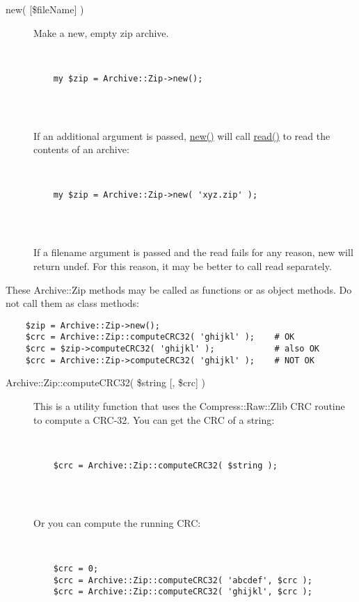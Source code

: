 \documentclass[]{article}
\renewcommand{\emph}[1]{\underline{#1}}
\begin{document}
\begin{description}
\item[new( {[}\$fileName{]} )]
Make a new, empty zip archive.

~

\begin{verbatim}
    my $zip = Archive::Zip->new();
    
\end{verbatim}

~

If an additional argument is passed, \emph{new()} will call
\emph{read()} to read the contents of an archive:

~

\begin{verbatim}
    my $zip = Archive::Zip->new( 'xyz.zip' );
    
\end{verbatim}

~

If a filename argument is passed and the read fails for any reason, new
will return undef. For this reason, it may be better to call read
separately.
\end{description}


These Archive::Zip methods may be called as functions or as object
methods. Do not call them as class methods:

\begin{verbatim}
    $zip = Archive::Zip->new();
    $crc = Archive::Zip::computeCRC32( 'ghijkl' );    # OK
    $crc = $zip->computeCRC32( 'ghijkl' );            # also OK
    $crc = Archive::Zip->computeCRC32( 'ghijkl' );    # NOT OK
\end{verbatim}

\begin{description}
\item[Archive::Zip::computeCRC32( \$string {[}, \$crc{]} )]
This is a utility function that uses the Compress::Raw::Zlib CRC routine
to compute a CRC-32. You can get the CRC of a string:

~

\begin{verbatim}
    $crc = Archive::Zip::computeCRC32( $string );
    
\end{verbatim}

~

Or you can compute the running CRC:

~

\begin{verbatim}
    $crc = 0;
    $crc = Archive::Zip::computeCRC32( 'abcdef', $crc );
    $crc = Archive::Zip::computeCRC32( 'ghijkl', $crc );
    
\end{verbatim}
\end{description}
\end{document}
